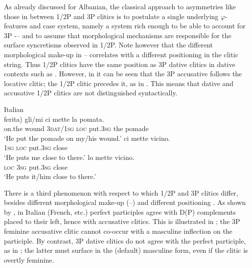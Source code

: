 \documentclass[output=paper,colorlinks,citecolor=brown,nonflat]{./langscibook}
\begin{document}
As already discussed for Albanian, the classical approach to asymmetries like those in  between 1/2P and 3P clitics is to postulate a single underlying $\varphi ${}-features and case system, namely a system rich enough to be able to account for 3P -– and to assume that morphological mechanisms are responsible for the surface syncretisms observed in 1/2P. Note however that the different morphological make-up in -- correlates with a different positioning in the clitic string. Thus 1/2P clitics have the same position as 3P dative clitics in dative contexts such as . However, in  it can be seen that the 3P accusative follows the locative clitic; the 1/2P clitic precedes it, as in . This means that dative and accusative 1/2P clitics are not distinguished syntactically.

\ea%
    \label{ex:manzini:13}
    Italian\\
    \ea\label{ex:manzini:13a} 
     {ferita)}   {gli/mi}    {ci}   {mette} {la} {pomata}.\\
        on.the wound   \textsc{3dat/1sg}   \textsc{loc}   put.\textsc{3sg} the pomade\\
    \glt ‘He put the pomade on my/his wound.’
    \ex\label{ex:manzini:13b} 
      {ci}   {mette}   {vicino}.\\
        \textsc{1sg}  \textsc{loc}  put.\textsc{3sg} close\\
    \glt ‘He puts me close to there.’
    \ex\label{ex:manzini:13c} 
      {lo}  {mette}   {vicino}.\\
        \textsc{loc}  \textsc{3sg}   put.\textsc{3sg} close\\
    \glt ‘He puts it/him close to there.’
    \z
\z

There is a third phenomenon with respect to which 1/2P and 3P clitics differ, besides different morphological make-up (--) and different positioning . As shown by \citet{Kayne1989}, in Italian (French, etc.) perfect participles agree with D(P) complements placed to their left, hence with accusative clitics. This is illustrated in ; the 3P feminine accusative clitic cannot co-occur with a masculine inflection on the participle. By contrast, 3P dative clitics do not agree with the perfect participle, as in ; the latter must surface in the (default) masculine form, even if the clitic is overtly feminine.
\end{document}
